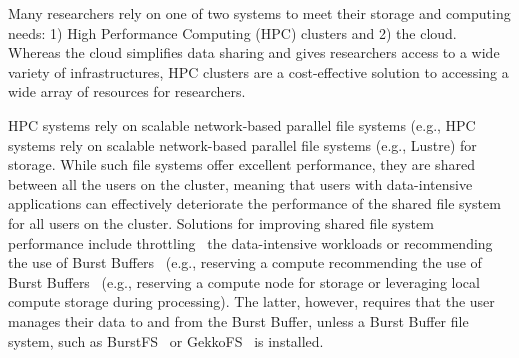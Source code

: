 \documentclass[fleqn,10pt]{wlscirep}
\begin{document}


    
    
    
    Many researchers rely on one of two systems to meet their storage and
    computing needs: 1) High Performance Computing (HPC) clusters and 2) the
    cloud. Whereas the cloud simplifies data sharing and gives researchers
    access to a wide variety of infrastructures, HPC clusters are a
    cost-effective solution to accessing a wide array of resources for
    researchers. %
    
    HPC systems rely on scalable network-based parallel file systems (e.g.,
    HPC systems rely on scalable network-based parallel file systems (e.g.,
    Lustre) for storage. While such file systems offer excellent performance,
    they are shared between all the users on the cluster, meaning that users
    with data-intensive applications can effectively deteriorate the performance
    of the shared file system for all users on the cluster. Solutions for
    improving shared file system performance include
    throttling~\cite{huang2020ooops} the data-intensive workloads or
    recommending the use of Burst Buffers~\cite{bb} (e.g., reserving a compute
    recommending the use of Burst Buffers~\cite{bb} (e.g., reserving a compute
    node for storage or leveraging local compute storage during processing). The
    latter, however, requires that the user manages their data to and from the
    Burst Buffer, unless a Burst Buffer file system, such as
    BurstFS~\cite{burstfs} or GekkoFS~\cite{gekkofs} is installed.
    
\end{document}
